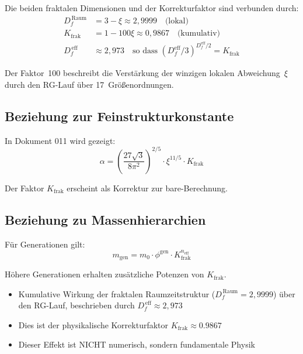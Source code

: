 	Die beiden fraktalen Dimensionen und der Korrekturfaktor sind verbunden durch:
	\begin{align}
		D_f^{\,\text{Raum}} &= 3 - \xi \approx 2{,}9999 \quad \text{(lokal)} \\
		K_{\text{frak}} &= 1 - 100\xi \approx 0{,}9867 \quad \text{(kumulativ)} \\
		D_f^{\,\text{eff}} &\approx 2{,}973 \quad \text{so dass } (D_f^{\text{eff}}/3)^{D_f^{\text{eff}}/2} = K_{\text{frak}}
	\end{align}
	
	Der Faktor~100 beschreibt die Verstärkung der winzigen lokalen Abweichung~$\xi$ durch den RG-Lauf über 17~Größenordnungen.
	
	\subsection{Beziehung zur Feinstrukturkonstante}
	
	In Dokument 011 wird gezeigt:
	\begin{equation}
		\alpha = \left(\frac{27\sqrt{3}}{8\pi^2}\right)^{2/5} \cdot \xi^{11/5} \cdot K_{\text{frak}}
	\end{equation}
	
	Der Faktor $K_{\text{frak}}$ erscheint als Korrektur zur bare-Berechnung.
	
	\subsection{Beziehung zu Massenhierarchien}
	
	Für Generationen gilt:
	\begin{equation}
		m_{\text{gen}} = m_0 \cdot \phi^{\text{gen}} \cdot K_{\text{frak}}^{n_{\text{eff}}}
	\end{equation}
	
	Höhere Generationen erhalten zusätzliche Potenzen von $K_{\text{frak}}$.
	
		\begin{itemize}
			\item Kumulative Wirkung der fraktalen Raumzeitstruktur ($D_f^{\,\text{Raum}} = 2{,}9999$) über den RG-Lauf, beschrieben durch $D_f^{\,\text{eff}} \approx 2{,}973$
			\item Dies ist der physikalische Korrekturfaktor $K_{\text{frak}} \approx 0.9867$
			\item Dieser Effekt ist NICHT numerisch, sondern fundamentale Physik
		\end{itemize}
		
